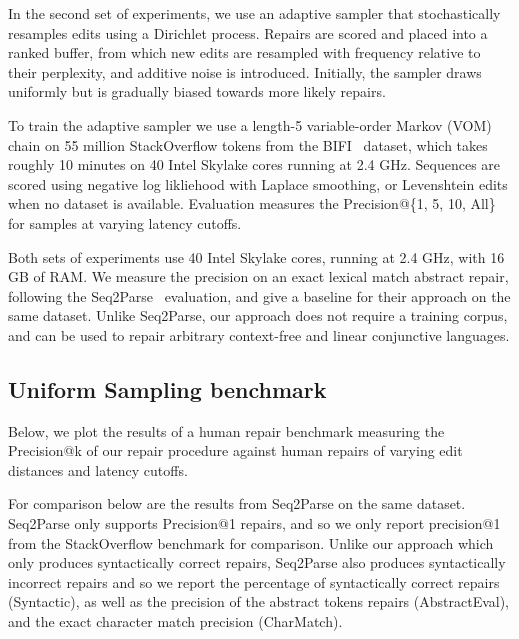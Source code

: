 \documentclass[sigplan,review,anonymous,acmsmall]{acmart}\settopmatter{printfolios=false,printccs=false,printacmref=false}
\begin{document}
In the second set of experiments, we use an adaptive sampler that stochastically resamples edits using a Dirichlet process. Repairs are scored and placed into a ranked buffer, from which new edits are resampled with frequency relative to their perplexity, and additive noise is introduced. Initially, the sampler draws uniformly but is gradually biased towards more likely repairs.

To train the adaptive sampler we use a length-5 variable-order Markov (VOM) chain on 55 million StackOverflow tokens from the BIFI~\cite{yasunaga2021break} dataset, which takes roughly 10 minutes on 40 Intel Skylake cores running at 2.4 GHz. Sequences are scored using negative log likliehood with Laplace smoothing, or Levenshtein edits when no dataset is available. Evaluation measures the Precision@\{1, 5, 10, All\} for samples at varying latency cutoffs.

Both sets of experiments use 40 Intel Skylake cores, running at 2.4 GHz, with 16 GB of RAM. We measure the precision on an exact lexical match abstract repair, following the Seq2Parse~\cite{sakkas2022seq2parse} evaluation, and give a baseline for their approach on the same dataset. Unlike Seq2Parse, our approach does not require a training corpus, and can be used to repair arbitrary context-free and linear conjunctive languages.

\subsection{Uniform Sampling benchmark}\label{sec:human}

Below, we plot the results of a human repair benchmark measuring the Precision@k of our repair procedure against human repairs of varying edit distances and latency cutoffs.%

\begin{figure}[H]
\resizebox{.3\textwidth}{!}{}
\resizebox{.3\textwidth}{!}{}
\resizebox{.3\textwidth}{!}{}
\end{figure}

For comparison below are the results from Seq2Parse on the same dataset. Seq2Parse only supports Precision@1 repairs, and so we only report precision@1 from the StackOverflow benchmark for comparison. Unlike our approach which only produces syntactically correct repairs, Seq2Parse also produces syntactically incorrect repairs and so we report the percentage of syntactically correct repairs (Syntactic), as well as the precision of the abstract tokens repairs (AbstractEval), and the exact character match precision (CharMatch).
\end{document}
